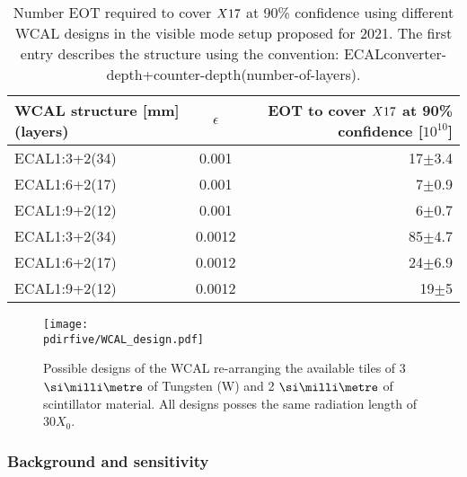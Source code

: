 \begin{center}
\begin{table}[tbh!]
  \begin{tabular}{|lcr|}
  \hline
  WCAL structure [mm](layers)  & $\epsilon$  & EOT to cover $X17$ at 90\% confidence [$10^{10}$] \\
  \hline
  ECAL1:3+2(34)                & 0.001   & 17$\pm$3.4                                            \\ 
  ECAL1:6+2(17)                & 0.001   & 7$\pm$0.9                                             \\
  ECAL1:9+2(12)                & 0.001   & 6$\pm$0.7                                             \\
  ECAL1:3+2(34)                & 0.0012  & 85$\pm$4.7                                            \\
  ECAL1:6+2(17)                & 0.0012  & 24$\pm$6.9                                            \\  
  ECAL1:9+2(12)                & 0.0012  & 19$\pm$5                                              \\  
  \hline
\end{tabular}
\caption[Possible WCAL design and with their possible experimental reach]{Number EOT required to cover $X17$ at 90\% confidence using different WCAL designs in the visible mode setup proposed for 2021. The first entry describes the structure using the convention:
  ECALconverter-depth+counter-depth(number-of-layers).}
\label{tab:wcal-length-results}
\end{table}
\end{center}

\begin{figure}[tbh!]
  \centering
  \texttt{[image: \\pdirfive/WCAL\_design.pdf]}
  \caption[New WCAL design for 2021]{Possible designs of the WCAL re-arranging the available tiles of 3 $\mmi$ of Tungsten (W) and 2 $\mmi$ of scintillator material. All designs posses the same radiation length of 30$X_0$.}
  \label{fig:wcal-design}
\end{figure}


\subsubsection{Background and sensitivity}
\label{ch5:sec:background-sensitivity}

